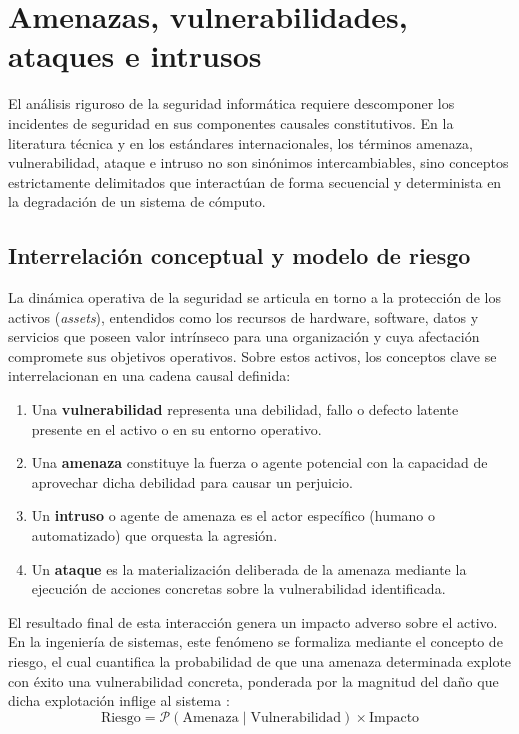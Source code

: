 \documentclass[12pt]{article}
\begin{document}
\section{Amenazas, vulnerabilidades, ataques e intrusos}\label{sec:amenazasVulnerabilidadesAtaquesIntrusos}

El análisis riguroso de la seguridad informática requiere descomponer los incidentes de seguridad en sus componentes causales constitutivos. En la literatura técnica y en los estándares internacionales, los términos amenaza, vulnerabilidad, ataque e intruso no son sinónimos intercambiables, sino conceptos estrictamente delimitados que interactúan de forma secuencial y determinista en la degradación de un sistema de cómputo.

\subsection{Interrelación conceptual y modelo de riesgo}\label{subsec:interrelacionConceptualRiesgo}

La dinámica operativa de la seguridad se articula en torno a la protección de los activos (\textit{assets}), entendidos como los recursos de hardware, software, datos y servicios que poseen valor intrínseco para una organización y cuya afectación compromete sus objetivos operativos. Sobre estos activos, los conceptos clave se interrelacionan en una cadena causal definida:
\begin{enumerate}[noitemsep, topsep=2pt]
    \item Una \textbf{vulnerabilidad} representa una debilidad, fallo o defecto latente presente en el activo o en su entorno operativo.
    \item Una \textbf{amenaza} constituye la fuerza o agente potencial con la capacidad de aprovechar dicha debilidad para causar un perjuicio.
    \item Un \textbf{intruso} o agente de amenaza es el actor específico (humano o automatizado) que orquesta la agresión.
    \item Un \textbf{ataque} es la materialización deliberada de la amenaza mediante la ejecución de acciones concretas sobre la vulnerabilidad identificada.
\end{enumerate}

El resultado final de esta interacción genera un impacto adverso sobre el activo. En la ingeniería de sistemas, este fenómeno se formaliza mediante el concepto de riesgo, el cual cuantifica la probabilidad de que una amenaza determinada explote con éxito una vulnerabilidad concreta, ponderada por la magnitud del daño que dicha explotación inflige al sistema \parencite[\S 2, p.\ 14]{nistSp800_30}:
\begin{equation}\label{eq:modeloRiesgo}
\text{Riesgo} = \mathcal{P}(\text{Amenaza} \mid \text{Vulnerabilidad}) \times \text{Impacto}
\end{equation}
\end{document}
